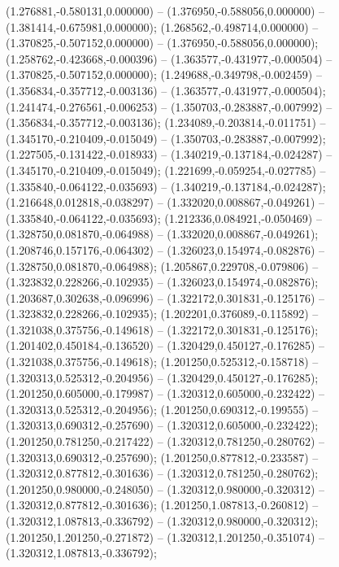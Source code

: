  (1.276881,-0.580131,0.000000) -- (1.376950,-0.588056,0.000000) -- (1.381414,-0.675981,0.000000);
 (1.268562,-0.498714,0.000000) -- (1.370825,-0.507152,0.000000) -- (1.376950,-0.588056,0.000000);
 (1.258762,-0.423668,-0.000396) -- (1.363577,-0.431977,-0.000504) -- (1.370825,-0.507152,0.000000);
 (1.249688,-0.349798,-0.002459) -- (1.356834,-0.357712,-0.003136) -- (1.363577,-0.431977,-0.000504);
 (1.241474,-0.276561,-0.006253) -- (1.350703,-0.283887,-0.007992) -- (1.356834,-0.357712,-0.003136);
 (1.234089,-0.203814,-0.011751) -- (1.345170,-0.210409,-0.015049) -- (1.350703,-0.283887,-0.007992);
 (1.227505,-0.131422,-0.018933) -- (1.340219,-0.137184,-0.024287) -- (1.345170,-0.210409,-0.015049);
 (1.221699,-0.059254,-0.027785) -- (1.335840,-0.064122,-0.035693) -- (1.340219,-0.137184,-0.024287);
 (1.216648,0.012818,-0.038297) -- (1.332020,0.008867,-0.049261) -- (1.335840,-0.064122,-0.035693);
 (1.212336,0.084921,-0.050469) -- (1.328750,0.081870,-0.064988) -- (1.332020,0.008867,-0.049261);
 (1.208746,0.157176,-0.064302) -- (1.326023,0.154974,-0.082876) -- (1.328750,0.081870,-0.064988);
 (1.205867,0.229708,-0.079806) -- (1.323832,0.228266,-0.102935) -- (1.326023,0.154974,-0.082876);
 (1.203687,0.302638,-0.096996) -- (1.322172,0.301831,-0.125176) -- (1.323832,0.228266,-0.102935);
 (1.202201,0.376089,-0.115892) -- (1.321038,0.375756,-0.149618) -- (1.322172,0.301831,-0.125176);
 (1.201402,0.450184,-0.136520) -- (1.320429,0.450127,-0.176285) -- (1.321038,0.375756,-0.149618);
 (1.201250,0.525312,-0.158718) -- (1.320313,0.525312,-0.204956) -- (1.320429,0.450127,-0.176285);
 (1.201250,0.605000,-0.179987) -- (1.320312,0.605000,-0.232422) -- (1.320313,0.525312,-0.204956);
 (1.201250,0.690312,-0.199555) -- (1.320313,0.690312,-0.257690) -- (1.320312,0.605000,-0.232422);
 (1.201250,0.781250,-0.217422) -- (1.320312,0.781250,-0.280762) -- (1.320313,0.690312,-0.257690);
 (1.201250,0.877812,-0.233587) -- (1.320312,0.877812,-0.301636) -- (1.320312,0.781250,-0.280762);
 (1.201250,0.980000,-0.248050) -- (1.320312,0.980000,-0.320312) -- (1.320312,0.877812,-0.301636);
 (1.201250,1.087813,-0.260812) -- (1.320312,1.087813,-0.336792) -- (1.320312,0.980000,-0.320312);
 (1.201250,1.201250,-0.271872) -- (1.320312,1.201250,-0.351074) -- (1.320312,1.087813,-0.336792);
